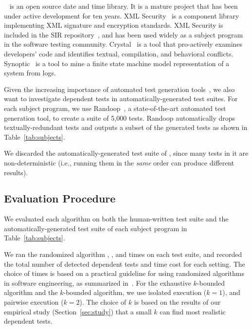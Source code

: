 \jt~\cite{jodatime} is an open source
date and time library. It is a mature project that
has been under active development
for ten years. XML Security~\cite{xmlsecurity}
is a component library implementing XML signature and encryption
standards. XML Security is included in
the SIR repository~\cite{sir}, and has been used widely
as a subject program in the software testing community.
Crystal~\cite{crystal} is a tool that
pro-actively examines developers' code and
identifies textual, compilation, and behavioral conflicts.
Synoptic~\cite{synoptic} is a tool to mine a finite state
machine model representation of a system from logs.

Given the increasing importance of automated test generation
tools~\cite{PachecoLET2007, ZhangSBE2011, Csallner:2004, fraseretal:ISSTA:2011},
we also want to investigate dependent tests in automatically-generated
test suites. For each subject program, we use
Randoop~\cite{PachecoLET2007}, a state-of-the-art automated
test generation tool, to create a suite of 5,000 tests.
Randoop automatically drops textually-redundant tests 
and outputs a subset of the generated tests as
shown in Table~\ref{tab:subjects}.

We discarded the automatically-generated test suite of
\jt, since many tests in it are non-deterministic (i.e., 
running them in the \textit{same} order
can produce different results).


\subsection{Evaluation Procedure}

We evaluated each algorithm 
on both the human-written test suite 
and the automatically-generated test suite
of each subject program in Table~\ref{tab:subjects}.


We ran the randomized algorithm \smalltrialnum, \mediumtrialnum,
and \trialnum times on each test suite, and recorded
the total number of detected dependent tests and time cost
for each setting. The choice of \trialnum times is based
on a practical guideline for using randomized algorithms
in software engineering, as summarized in~\cite{Arcuri:2011}.
%
For the exhaustive $k$-bounded algorithm
and the \dependenceaware{} $k$-bounded algorithm,
we use isolated execution ($k = 1$), and
pairwise execution ($k = 2$). The choice of $k$ is
based on the results of our empirical
study (Section~\ref{sec:study}) that a small $k$
can find most realistic dependent tests.

